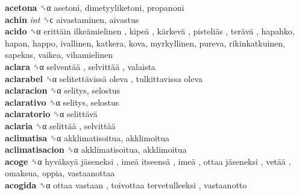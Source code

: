 \textbf{acetona} ␝α  asetoni, dimetyyliketoni, propanoni  \\
\textbf{achin} \emph{int}  ␝ϲ  aivastaminen, aivastus  \\
\textbf{acido} ␝α   erittäin ilkeämielinen ,  kipeä ,  kärkevä ,  pisteliäs ,  terävä , hapahko, hapan, happo, ivallinen, katkera, kova, myrkyllinen, pureva, rikinkatkuinen, sapekas, vaikea, vihamielinen  \\
\textbf{aclara} ␝α   selventää ,  selvittää , valaista  \\
\textbf{aclarabel} ␝α   selitettävissä oleva ,  tulkittavissa oleva   \\
\textbf{aclaracion} ␝α  selitys, selostus  \\
\textbf{aclarativo} ␝α  selitys, selostus  \\
\textbf{aclaratorio} ␝α   selittävä   \\
\textbf{aclaria} ␝α   selittää ,  selvittää   \\
\textbf{aclimatisa} ␝α  akklimatisoitua, akklimoitua  \\
\textbf{aclimatisacion} ␝α  akklimatisoitua, akklimoitua  \\
\textbf{acoge} ␝α   hyväksyä jäseneksi ,  imeä itseensä ,  imeä ,  ottaa jäseneksi ,  vetää , omaksua, oppia, vastaanottaa  \\
\textbf{acogida} ␝α   ottaa vastaan ,  toivottaa tervetulleeksi , vastaanotto  \\
